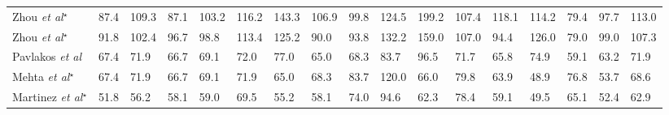\documentclass{bmvc2k}
\def\etal{\emph{et al}\bmvaOneDot}
\begin{document}
\begin{table}[ht]
\begin{center}
\begin{tabular}{p{1.5cm}p{0.25cm}p{0.25cm}p{0.25cm}p{0.25cm}p{0.25cm}p{0.25cm}p{0.25cm}p{0.25cm}p{0.25cm}p{0.25cm}p{0.25cm}p{0.25cm}p{0.25cm}p{0.25cm}p{0.25cm}p{0.25cm}}
 \cellcolor{gray!30} {\tiny Zhou \etal \cite{780906}$^{\star}$} &  \cellcolor{gray!30} {\tiny 87.4} & \cellcolor{gray!30} {\tiny 109.3} & \cellcolor{gray!30} {\tiny 87.1} & \cellcolor{gray!30} {\tiny 103.2} & \cellcolor{gray!30} {\tiny 116.2} & \cellcolor{gray!30} {\tiny 143.3} & \cellcolor{gray!30} {\tiny 106.9} & \cellcolor{gray!30} {\tiny 99.8} & \cellcolor{gray!30} {\tiny 124.5} & \cellcolor{gray!30} {\tiny 199.2} & \cellcolor{gray!30} {\tiny 107.4} & \cellcolor{gray!30} {\tiny 118.1} & \cellcolor{gray!30} {\tiny 114.2} & \cellcolor{gray!30} {\tiny 79.4} & \cellcolor{gray!30} {\tiny 97.7} & \cellcolor{gray!30} {\tiny 113.0} \\
{\tiny Zhou \etal \cite{Zhou2016DeepKP}$^{\star}$} & {\tiny 91.8} & {\tiny 102.4} & {\tiny 96.7} & {\tiny 98.8} & {\tiny 113.4} & {\tiny 125.2} & {\tiny 90.0} & {\tiny 93.8} & {\tiny 132.2} & {\tiny 159.0} & {\tiny 107.0} & {\tiny 94.4} & {\tiny 126.0} & {\tiny 79.0} & {\tiny 99.0} & {\tiny 107.3}\\
\cellcolor{gray!30} {\tiny Pavlakos \etal \cite{pavlakos2017coarse}} & \cellcolor{gray!30} {\tiny 67.4} & \cellcolor{gray!30} {\tiny 71.9} & \cellcolor{gray!30} {\tiny 66.7} & \cellcolor{gray!30} {\tiny 69.1} &  \cellcolor{gray!30} {\tiny 72.0} &  \cellcolor{gray!30} {\tiny 77.0} &  \cellcolor{gray!30} {\tiny 65.0} &  \cellcolor{gray!30} {\tiny 68.3} &  \cellcolor{gray!30} {\tiny 83.7} &  \cellcolor{gray!30} {\tiny 96.5} & \cellcolor{gray!30} {\tiny 71.7} & \cellcolor{gray!30} {\tiny 65.8} &  \cellcolor{gray!30} {\tiny 74.9} & \cellcolor{gray!30} {\tiny 59.1} & \cellcolor{gray!30} {\tiny 63.2} & \cellcolor{gray!30} {\tiny 71.9} \\
{\tiny Mehta \etal \cite{8374605}$^{\star}$} & {\tiny 67.4} & {\tiny 71.9} & {\tiny 66.7} & {\tiny 69.1} & {\tiny 71.9} & {\tiny 65.0} & {\tiny 68.3} & {\tiny 83.7} & {\tiny 120.0} & {\tiny 66.0} & {\tiny 79.8} & {\tiny 63.9} & {\tiny 48.9} & {\tiny 76.8} & {\tiny53.7} & {\tiny 68.6} \\
\cellcolor{gray!30} {\tiny Martinez \etal \cite{martinez_2017_3dbaseline}$^{\star}$} & \cellcolor{gray!30} {\tiny 51.8} & \cellcolor{gray!30} {\tiny 56.2} & \cellcolor{gray!30} {\tiny 58.1} & \cellcolor{gray!30} {\tiny 59.0} & \cellcolor{gray!30} {\tiny 69.5} & \cellcolor{gray!30} {\tiny 55.2} & \cellcolor{gray!30} {\tiny 58.1} & \cellcolor{gray!30} {\tiny 74.0} & \cellcolor{gray!30} {\tiny 94.6} & \cellcolor{gray!30} {\tiny 62.3} & \cellcolor{gray!30} {\tiny 78.4} & \cellcolor{gray!30} {\tiny 59.1} & \cellcolor{gray!30} {\tiny 49.5} & \cellcolor{gray!30} {\tiny 65.1} & \cellcolor{gray!30} {\tiny 52.4} & \cellcolor{gray!30} {\tiny 62.9} \\

\end{tabular}
\end{center}
\end{table}
\end{document}
